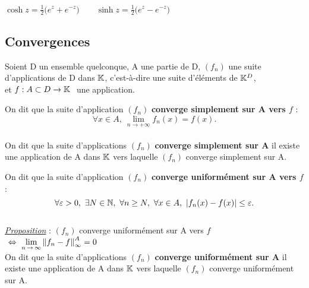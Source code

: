 \vspace{0.4cm}

\hspace{6.25cm}\( \displaystyle \cosh z = \frac{1}{2}\bigl(e^{z}+e^{-z}\bigr) \qquad \sinh z = \frac{1}{2}\bigl(e^{z}-e^{-z}\bigr) \)

\vspace{1.4cm}

\subsection{Convergences}

\vspace{0.7cm}

\begin{center}
    Soient D un ensemble quelconque, A une partie de D, \((f_n)\) une suite\\
    d'applications de D dans \(\mathbb{K}\), c'est-à-dire une suite d'éléments de \(\mathbb{K}^D\), \\et \(f:A\subset D\to \mathbb{K} \ \) une application.
\end{center}

\vspace{1cm}

\noindent On dit que la suite d'application \((f_n)\) \textbf{converge simplement sur A vers \(f\)} \ssi :\vspace{-0.2cm} \[ \forall x\in A,\ \lim_{n\to +\infty}f_n(x)=f(x). \]\vspace{-0cm}\\
On dit que la suite d'applications \((f_n)\) \textbf{converge simplement sur A} \ssi il existe une application de A dans \(\mathbb{K}\) vers laquelle \((f_n)\) converge simplement sur A.

\vspace{2cm}

\noindent On dit que la suite d'application \((f_n)\) \textbf{converge uniformément sur A vers \(f\)} \ssi :\vspace{-0.2cm} \[ \forall \varepsilon>0,\ \exists N\in \mathbb{N},\ \forall n\geq N,\ \forall x\in A,\ |f_n(x)-f(x)|\leq \varepsilon. \]\vspace{-0cm}\\
\underline{\emph{Proposition}} : $(f_n)$ converge uniformément sur A vers $f$ \(\ \Leftrightarrow \ \displaystyle \lim_{n\,\to\,\infty} \left\lVert f_n-f\right\rVert_\infty^A=0\)\vspace{0.7cm}\\
On dit que la suite d'applications \((f_n)\) \textbf{converge uniformément sur A} \ssi il existe une application de A dans \(\mathbb{K}\) vers laquelle \((f_n)\) converge uniformément sur A.\vspace{0.2cm}


